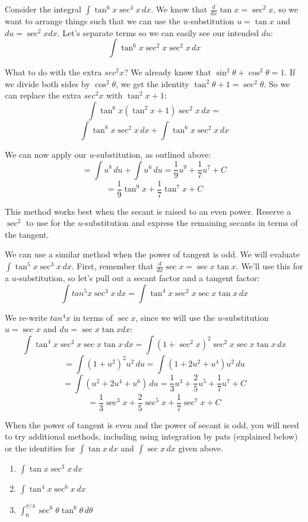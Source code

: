 Consider the integral $\int \tan^6{x} \sec^4{x}\,dx$. We know that $\frac{d}{dx}
\tan{x} = \sec^2{x}$, so we want to arrange things such that we can use the 
$u$-substitution $u = \tan{x}$ and $du = \sec^2{x} dx$. Let's separate terms so
we can easily see our intended $du$:
$$\int \tan^6{x} \sec^2{x} \sec^2{x}\,dx$$

What to do with the extra $sec^2{x}$? We already know that $\sin^2{\theta} + 
\cos^2{\theta} = 1$. If we divide both sides by $\cos^2{\theta}$, we get the 
identity $\tan^2{\theta} + 1 = \sec^2{\theta}$. So we can replace the extra 
$sec^2{x}$ with $\tan^2{x} + 1$:
$$\int \tan^6{x} \left( \tan^2{x} + 1 \right) \sec^2{x}\,dx = $$
$$\int \tan^8{x} \sec^2{x}\,dx + \int \tan^6{x} \sec^2{x}\,dx$$

We can now apply our $u$-substitution, as outlined above:
$$= \int u^8\,du + \int u^6\,du = \frac{1}{9}u^9 + \frac{1}{7}u^7 + C$$
$$= \frac{1}{9}\tan^9{x} + \frac{1}{7}\tan^7{x} + C$$

This method works best when the secant is raised to an even power. Reserve a 
$\sec^2$ to use for the $u$-substitution and express the remaining secants in 
terms of the tangent. 

We can use a similar method when the power of tangent is odd. We will evaluate 
$\int \tan^5{x} \sec^3{x}\,dx$. First, remember that $\frac{d}{dx} \sec{x} = 
\sec{x} \tan{x}$. We'll use this for a $u$-substitution, so let's pull out a 
secant factor and a tangent factor:
$$\int tan^5{x} \sec^3{x}\,dx = \int \tan^4{x} \sec^2{x} \sec{x} \tan{x}\,dx$$

We re-write $tan^4{x}$ in terms of $\sec{x}$, since we will use the 
$u$-substitution $u = \sec{x}$ and $du = \sec{x} \tan{x} dx$:
$$\int \tan^4{x} \sec^2{x} \sec{x} \tan{x}\,dx = \int \left( 1 + \sec^2{x} 
\right)^2 \sec^2{x} \sec{x} \tan{x}\,dx$$
$$= \int \left( 1 + u^2 \right)^2 u^2\,du = \int \left(1 + 2u^2 + u^4 \right) 
u^2\,du$$
$$= \int \left( u^2 + 2u^4 + u^6 \right)\,du = \frac{1}{3}u^3 + \frac{2}{5}u^5 
+ \frac{1}{7}u^7 + C$$
$$= \frac{1}{3}\sec^3{x} + \frac{2}{5}\sec^5{x} + \frac{1}{7}\sec^7{x} + C$$

When the power of tangent is even and the power of secant is odd, you will 
need to try additional methods, including using integration by pats (explained 
below) or the identities for $\int \tan{x}\,dx$ and $\int \sec{x}\,dx$ given 
above. 

\begin{Exercise}[title = {Integrating Powers of Secant and Tangent}, 
label = power_3]
\begin{enumerate}
\item $\int \tan{x} \sec^3{x}\,dx$
\item $\int \tan^4{x} \sec^6{x}\,dx$
\item $\int_0^{\pi/4} \sec^6{\theta} \tan^6{\theta}\,d\theta$
\end{enumerate}
\end{Exercise}

